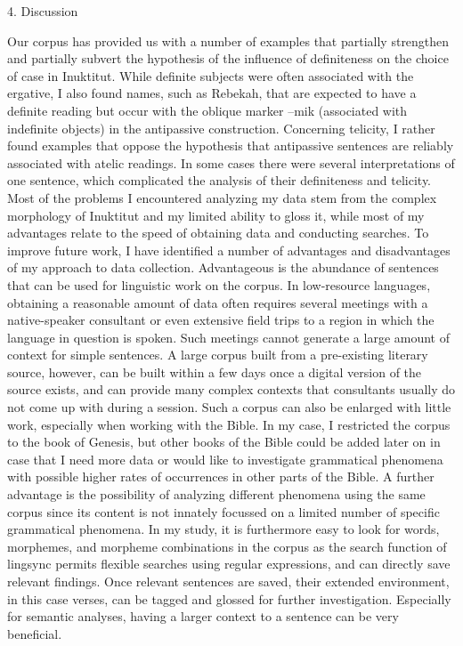 \documentclass[12pt]{article}
\begin{document}
4. Discussion 

Our corpus has provided us with a number of examples that partially strengthen and partially subvert the hypothesis of the influence of definiteness on the choice of case in Inuktitut. While definite subjects were often associated with the ergative, I also found names, such as Rebekah, that are expected to have a definite reading but occur with the oblique marker –mik (associated with indefinite objects) in the antipassive construction. Concerning telicity, I rather found examples that oppose the hypothesis that antipassive sentences are reliably associated with atelic readings. In some cases there were several interpretations of one sentence, which complicated the analysis of their definiteness and telicity. Most of the problems I encountered analyzing my  data stem from the complex morphology of Inuktitut and my  limited ability to gloss it, while most of my  advantages relate to the speed of obtaining data and conducting searches.
To improve future work, I have identified a number of advantages and disadvantages of my approach to data collection. Advantageous is the abundance of sentences that can be used for linguistic work on the corpus. In low-resource languages, obtaining a reasonable amount of data often requires several meetings with a native-speaker consultant or even extensive field trips to a region in which the language in question is spoken. Such meetings cannot generate a large amount of context for simple sentences. A large corpus built from a pre-existing literary source, however, can be built within a few days once a digital version of the source exists, and can provide many complex contexts that consultants usually do not come up with during a session. Such a corpus can also be enlarged with little work, especially when working with the Bible. In my  case, I restricted the corpus to the book of Genesis, but other books of the Bible could be added later on in case that I need more data or would like to investigate grammatical phenomena with possible higher rates of occurrences in other parts of the Bible.
A further advantage is the possibility of analyzing different phenomena using the same corpus since its content is not innately focussed on a limited number of specific grammatical phenomena. In my study, it is furthermore easy to look for words, morphemes, and morpheme combinations in the corpus as the search function of lingsync permits flexible searches using regular expressions, and can directly save relevant findings. Once relevant sentences are saved, their extended environment, in this case verses, can be tagged and glossed for further investigation. Especially for semantic analyses, having a larger context to a sentence can be very beneficial.
\end{document}
